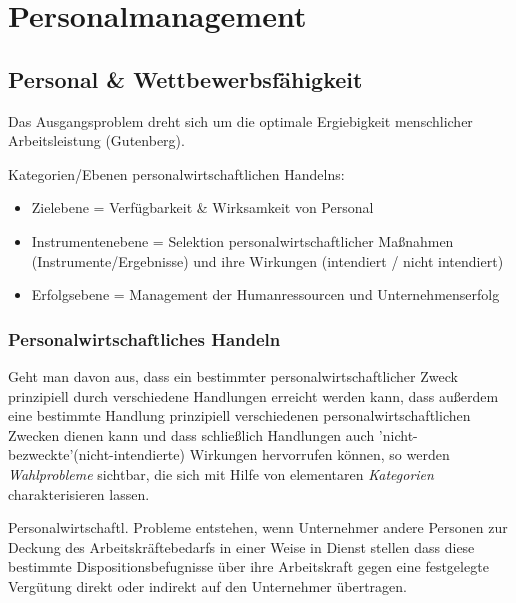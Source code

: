 \documentclass[11pt]{article}
\date{\today}
\title{}
\begin{document}
\tableofcontents

\section{Personalmanagement}
\label{sec:orge0e7ce5}
\subsection{Personal \& Wettbewerbsfähigkeit}
\label{sec:org0dc8524}
Das Ausgangsproblem dreht sich um die optimale Ergiebigkeit menschlicher Arbeitsleistung (Gutenberg).

Kategorien/Ebenen personalwirtschaftlichen Handelns:
\begin{itemize}
\item Zielebene = Verfügbarkeit \& Wirksamkeit von Personal
\item Instrumentenebene = Selektion personalwirtschaftlicher Maßnahmen (Instrumente/Ergebnisse) und ihre Wirkungen (intendiert / nicht intendiert)
\item Erfolgsebene = Management der Humanressourcen und Unternehmenserfolg
\end{itemize}

\subsubsection{Personalwirtschaftliches Handeln}
\label{sec:org8416789}
Geht man davon aus, dass ein bestimmter personalwirtschaftlicher Zweck prinzipiell durch verschiedene Handlungen erreicht werden kann, dass außerdem eine bestimmte Handlung prinzipiell verschiedenen personalwirtschaftlichen Zwecken dienen kann und dass schließlich Handlungen auch 'nicht-bezweckte'(nicht-intendierte) Wirkungen hervorrufen können, so werden \emph{Wahlprobleme} sichtbar, die sich mit Hilfe von elementaren \emph{Kategorien} charakterisieren lassen.

Personalwirtschaftl. Probleme entstehen, wenn Unternehmer andere Personen zur Deckung des Arbeitskräftebedarfs in einer Weise in Dienst stellen dass diese bestimmte Dispositionsbefugnisse über ihre Arbeitskraft gegen eine festgelegte Vergütung direkt oder indirekt auf den Unternehmer übertragen.
\end{document}
